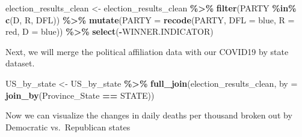 \documentclass[
]{article}
\newenvironment{Shaded}{\begin{snugshade}}{\end{snugshade}}
\newcommand{\AttributeTok}[1]{\textcolor[rgb]{0.13,0.29,0.53}{#1}}
\newcommand{\FunctionTok}[1]{\textcolor[rgb]{0.13,0.29,0.53}{\textbf{#1}}}
\newcommand{\NormalTok}[1]{#1}
\newcommand{\OtherTok}[1]{\textcolor[rgb]{0.56,0.35,0.01}{#1}}
\newcommand{\SpecialCharTok}[1]{\textcolor[rgb]{0.81,0.36,0.00}{\textbf{#1}}}
\newcommand{\StringTok}[1]{\textcolor[rgb]{0.31,0.60,0.02}{#1}}
\begin{document}
\begin{Shaded}
\begin{Highlighting}[]
\NormalTok{election\_results\_clean }\OtherTok{\textless{}{-}}\NormalTok{ election\_results\_clean }\SpecialCharTok{\%\textgreater{}\%}
  \FunctionTok{filter}\NormalTok{(PARTY }\SpecialCharTok{\%in\%} \FunctionTok{c}\NormalTok{(}\StringTok{\textquotesingle{}D\textquotesingle{}}\NormalTok{, }\StringTok{\textquotesingle{}R\textquotesingle{}}\NormalTok{, }\StringTok{\textquotesingle{}DFL\textquotesingle{}}\NormalTok{)) }\SpecialCharTok{\%\textgreater{}\%}
  \FunctionTok{mutate}\NormalTok{(}\AttributeTok{PARTY =} \FunctionTok{recode}\NormalTok{(PARTY, }\AttributeTok{DFL =} \StringTok{\textquotesingle{}blue\textquotesingle{}}\NormalTok{, }\AttributeTok{R =} \StringTok{\textquotesingle{}red\textquotesingle{}}\NormalTok{, }\AttributeTok{D =} \StringTok{\textquotesingle{}blue\textquotesingle{}}\NormalTok{)) }\SpecialCharTok{\%\textgreater{}\%}
  \FunctionTok{select}\NormalTok{(}\SpecialCharTok{{-}}\NormalTok{WINNER.INDICATOR)}
\end{Highlighting}
\end{Shaded}

Next, we will merge the political affiliation data with our COVID19 by
state dataset.

\begin{Shaded}
\begin{Highlighting}[]
\NormalTok{US\_by\_state }\OtherTok{\textless{}{-}}\NormalTok{ US\_by\_state }\SpecialCharTok{\%\textgreater{}\%}
  \FunctionTok{full\_join}\NormalTok{(election\_results\_clean, }\AttributeTok{by =} \FunctionTok{join\_by}\NormalTok{(Province\_State }\SpecialCharTok{==}\NormalTok{ STATE))}
\end{Highlighting}
\end{Shaded}

Now we can visualize the changes in daily deaths per thousand broken out
by Democratic vs.~Republican states
\end{document}
